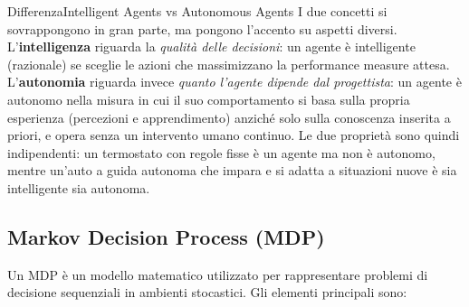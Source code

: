 \documentclass[a4paper, 11pt, oneside]{book}
\theoremstyle{definition}
\begin{document}
	\begin{nota}
		{Differenza}{Intelligent Agents vs Autonomous Agents} I due concetti si
		sovrappongono in gran parte, ma pongono l'accento su aspetti diversi.
		L'\textbf{intelligenza} riguarda la \emph{qualit\`a delle decisioni}: un
		agente \`e intelligente (razionale) se sceglie le azioni che massimizzano
		la performance measure attesa. L'\textbf{autonomia}
		riguarda invece \emph{quanto l'agente dipende dal progettista}: un agente \`e
		autonomo nella misura in cui il suo comportamento si basa sulla propria esperienza
		(percezioni e apprendimento) anzich\'e solo sulla conoscenza inserita a priori,
		e opera senza un intervento umano continuo. Le due propriet\`a sono quindi
		indipendenti: un termostato con regole fisse \`e un agente ma non \`e autonomo,
		mentre un'auto a guida autonoma che impara e si adatta a situazioni nuove \`e sia
		intelligente sia autonoma.
	\end{nota}

	\subsection{Markov Decision Process (MDP)}
	Un MDP \`e un modello matematico utilizzato per rappresentare problemi di decisione
	sequenziali in ambienti stocastici. Gli elementi principali sono:
\end{document}
